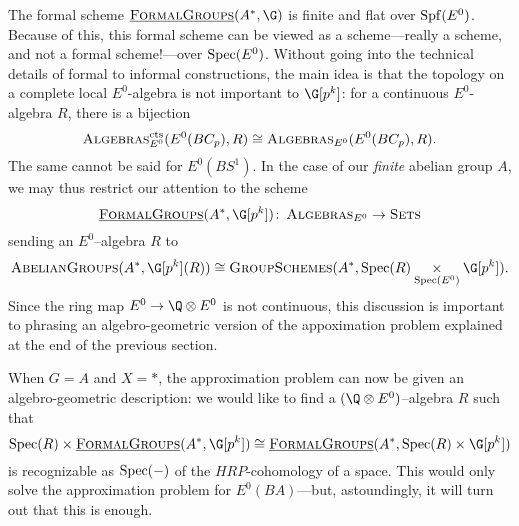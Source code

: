 The formal scheme \(\InternalHom{FormalGroups}(A^*,\G)\) is finite and flat over \(\operatorname{Spf}(E^0)\). Because of this, this formal scheme can be viewed as a scheme---really a scheme, and not a formal scheme!---over \(\operatorname{Spec}(E^0)\). Without going into the technical details of formal to informal constructions, the main idea is that the topology on a complete local \(E^0\)-algebra is not important to \(\G[p^k]\): for a continuous \(E^0\)-algebra \(R\), there is a bijection
\[
\normalfont\textsc{Algebras}_{E^0}^{\mathrm{cts}}(E^0(BC_p),R) \cong \normalfont\textsc{Algebras}_{E^0}(E^0(BC_p),R).
\]
The same cannot be said for \(E^0(BS^1)\).  In the case of our \emph{finite} abelian group $A$, we may thus restrict our attention to the scheme
\[
\InternalHom{FormalGroups}(A^*,\G[p^k]) \co \CatOf{Algebras}_{E^0} \rightarrow \CatOf{Sets}
\]
sending an \(E^0\)--algebra \(R\) to
\[
\CatOf{AbelianGroups}(A^*, \G[p^k](R)) \cong \CatOf{GroupSchemes}(A^*, \Spec(R) \underset{{\Spec(E^0)}}{\times} \G[p^k]).
\]
Since the ring map \(E^0 \rightarrow \Q \otimes E^0\) is not continuous, this discussion is important to phrasing an algebro-geometric version of the appoximation problem explained at the end of the previous section.

When \(G = A\) and \(X = *\), the approximation problem can now be given an algebro-geometric description: we would like to find a \((\Q \otimes E^0)\)--algebra \(R\) such that 
\[
\Spec(R) \times \InternalHom{FormalGroups}(A^*, \G[p^k]) \cong  \InternalHom{FormalGroups}(A^*, \Spec(R) \times \G[p^k])
\]
is recognizable as \(\operatorname{Spec}(-)\) of the \(HRP\)-cohomology of a space. This would only solve the approximation problem for \(E^0(BA)\)---but, astoundingly, it will turn out that this is enough.

